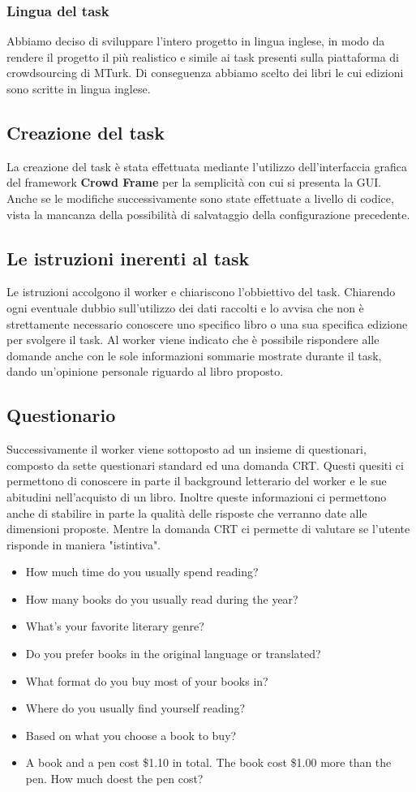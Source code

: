 \documentclass[a4paper,11pt]{report}
\begin{document}
\subsubsection{Lingua del task}
Abbiamo deciso di sviluppare l'intero progetto in lingua inglese, in modo da rendere il progetto il più realistico e simile ai task presenti sulla piattaforma di crowdsourcing di MTurk. Di conseguenza abbiamo scelto dei libri le cui edizioni sono scritte in lingua inglese.

\subsection{Creazione del task}
La creazione del task è stata effettuata mediante l'utilizzo dell'interfaccia grafica del framework \textbf{Crowd Frame} per la semplicità con cui si presenta la GUI. Anche se le modifiche successivamente sono state effettuate a livello di codice, vista la mancanza della possibilità di salvataggio della configurazione precedente.

\subsection{Le istruzioni inerenti al task}
Le istruzioni accolgono il worker e chiariscono l'obbiettivo del task. Chiarendo ogni eventuale dubbio sull'utilizzo dei dati raccolti e lo avvisa che non è strettamente necessario conoscere uno specifico libro o una sua specifica edizione per svolgere il task. Al worker viene indicato che è possibile rispondere alle domande anche con le sole informazioni sommarie mostrate durante il task, dando un'opinione personale riguardo al libro proposto.
\pagebreak
\subsection{Questionario}
Successivamente il worker viene sottoposto ad un insieme di questionari, composto da sette questionari standard ed una domanda CRT.
Questi quesiti ci permettono di conoscere in parte il background letterario del worker e le sue abitudini nell'acquisto di un libro.
Inoltre queste informazioni ci permettono anche di stabilire in parte la qualità delle risposte che verranno date alle dimensioni proposte.
Mentre la domanda CRT ci permette di valutare se l'utente risponde in maniera "istintiva".
\begin{itemize}
	\item How much time do you usually spend reading?
	\item How many books do you usually read during the year?
	\item What's your favorite literary genre?
	\item Do you prefer books in the original language or translated?
	\item What format do you buy most of your books in?
	\item Where do you usually find yourself reading?
	\item Based on what you choose a book to buy?
	\item A book and a pen cost \$1.10 in total. The book cost \$1.00 more than the pen. How much doest the pen cost?
\end{itemize}
\end{document}
